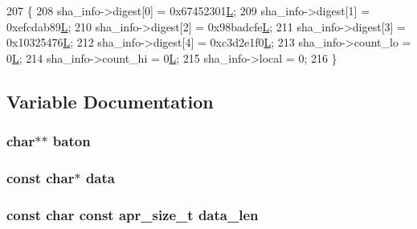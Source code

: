 \begin{DoxyCode}
207 \{
208     sha\_info->digest[0] = 0x67452301\hyperlink{mod__lua_8h_a62f94dfc0036bec0c14106c2f15caf3e}{L};
209     sha\_info->digest[1] = 0xefcdab89\hyperlink{mod__lua_8h_a62f94dfc0036bec0c14106c2f15caf3e}{L};
210     sha\_info->digest[2] = 0x98badcfe\hyperlink{mod__lua_8h_a62f94dfc0036bec0c14106c2f15caf3e}{L};
211     sha\_info->digest[3] = 0x10325476\hyperlink{mod__lua_8h_a62f94dfc0036bec0c14106c2f15caf3e}{L};
212     sha\_info->digest[4] = 0xc3d2e1f0\hyperlink{mod__lua_8h_a62f94dfc0036bec0c14106c2f15caf3e}{L};
213     sha\_info->count\_lo = 0\hyperlink{mod__lua_8h_a62f94dfc0036bec0c14106c2f15caf3e}{L};
214     sha\_info->count\_hi = 0\hyperlink{mod__lua_8h_a62f94dfc0036bec0c14106c2f15caf3e}{L};
215     sha\_info->local = 0;
216 \}
\end{DoxyCode}


\subsection{Variable Documentation}
\subsubsection[{\texorpdfstring{baton}{baton}}]{ char$\ast$$\ast$ baton}\hypertarget{group__APR__Util__MC_ga37840dc44e2b0b5a127a6828fffe2a8c}{}\label{group__APR__Util__MC_ga37840dc44e2b0b5a127a6828fffe2a8c}
\subsubsection[{\texorpdfstring{data}{data}}]{\setlength{\rightskip}{0pt plus 5cm}const char$\ast$ {\bf data}}\hypertarget{group__APR__Util__MC_ga8f64897c7ccc5c13f276d1d07c4e7095}{}\label{group__APR__Util__MC_ga8f64897c7ccc5c13f276d1d07c4e7095}
\subsubsection[{\texorpdfstring{data\+\_\+len}{data_len}}]{\setlength{\rightskip}{0pt plus 5cm}const char const {\bf apr\+\_\+size\+\_\+t} data\+\_\+len}\hypertarget{group__APR__Util__MC_ga371e964d98d4000f4bc080fa4ad81902}{}\label{group__APR__Util__MC_ga371e964d98d4000f4bc080fa4ad81902}
